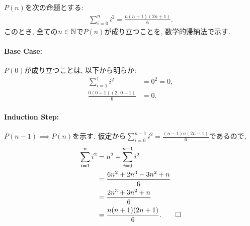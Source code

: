 \begin{proof*}
  $P(n)$を次の命題とする:
  \begin{align*}
    \sum_{i=0}^{n}i^2=\frac{n(n+1)(2n+1)}{6}.
  \end{align*}
  このとき,
  全ての$n\in\mathbb{N}$で$P(n)$が成り立つことを,
  数学的帰納法で示す.

  \paragraph{Base Case:}
  $P(0)$が成り立つことは, 以下から明らか:
  \begin{align*}
    \sum_{i=1}^{1}i^2&=0^2=0,\\
    \frac{0(0+1)(2\cdot 0+1)}{6}&=0.
  \end{align*}

  \paragraph{Induction Step:}
  $P(n-1)\implies P(n)$を示す.
  仮定から$\sum_{i=0}^{n-1}i^2=\frac{(n-1)n(2n-1)}{6}$であるので,
  \begin{align*}
    \sum_{i=1}^{n}i^2&=n^2+\sum_{i=0}^{n-1}i^2\\
    &=\frac{6n^2+2n^3-3n^2+n}{6}\\
    &=\frac{2n^3+3n^2+n}{6}\\
    &=\frac{n(n+1)(2n+1)}{6}
    .\qedhere
  \end{align*}
\end{proof*}

